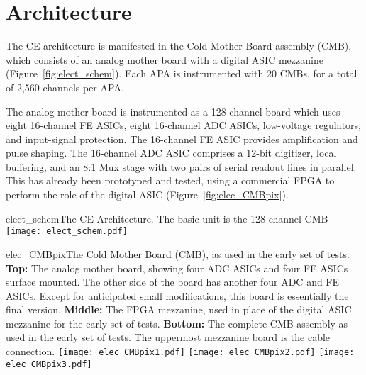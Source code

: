 %
\section{Architecture}
\label{sec:fe_arch}

The CE architecture is manifested in the Cold Mother Board assembly (CMB),
which consists of an analog mother board with a digital ASIC mezzanine (Figure~\ref{fig:elect_schem}).
Each APA is instrumented with 20 CMBs, for a total of 2,560 channels per APA.

The analog mother board is instrumented as a 128-channel board which uses eight 16-channel FE ASICs,
eight 16-channel ADC ASICs, low-voltage regulators, and input-signal protection.
The 16-channel FE ASIC provides amplification and pulse shaping.
The 16-channel ADC ASIC comprises a 12-bit digitizer, local buffering,
and an 8:1 Mux stage with two pairs of serial readout lines in parallel.
This has already been prototyped and tested,
using a commercial FPGA to perform the role of the digital ASIC (Figure~\ref{fig:elec_CMBpix}).

\begin{cdrfigure}{elect_schem}{The CE Architecture. The basic unit is the 128-channel CMB}
\texttt{[image: elect\_schem.pdf]}
\end{cdrfigure}

\begin{cdrfigure}{elec_CMBpix}{The Cold Mother Board (CMB), as used in the early set of tests.
  {\bf Top:} The analog mother board, showing four ADC ASICs and four FE ASICs surface mounted.
  The other side of the board has another four ADC and FE ASICs.
  Except for anticipated small modifications, this board is essentially the final version.
  {\bf Middle:} The FPGA mezzanine, used in place of the digital ASIC mezzanine for the early set of tests.
  {\bf Bottom:} The complete CMB assembly as used in the early set of tests.
  The uppermost mezzanine board is the cable connection.}
\texttt{[image: elec\_CMBpix1.pdf]}
\texttt{[image: elec\_CMBpix2.pdf]}
\texttt{[image: elec\_CMBpix3.pdf]}
\end{cdrfigure}

